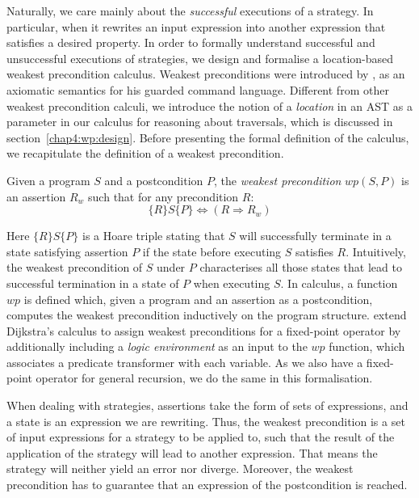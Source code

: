 Naturally, we care mainly about the \emph{successful} executions of a strategy. In particular, when it rewrites an input expression into another expression that satisfies a desired property. In order to formally understand successful and unsuccessful executions of strategies, we design and formalise a location-based weakest precondition calculus. Weakest preconditions were introduced by \citet{DBLP:journals/cacm/Dijkstra75}, as an axiomatic semantics for his guarded command language.
Different from other weakest precondition calculi, we introduce the notion of a \emph{location} in an AST as a parameter in our calculus for reasoning about traversals, which is discussed in section~\ref{chap4:wp:design}.
Before presenting the formal definition of the calculus, we recapitulate the definition of a weakest precondition.
\begin{definition} Given a program $S$ and a postcondition $P$, the \textit{weakest precondition} $\mathit{wp}(S,P)$ is an assertion $R_w$ such that for any precondition $R$:
    \[\{R\} S \{P\} \Leftrightarrow (R \Rightarrow R_w)\]
\end{definition}
\noindent Here $\{R\} S \{P\}$ is a Hoare triple stating that $S$ will successfully terminate in a state satisfying assertion $P$ if the state before executing $S$ satisfies $R$. Intuitively, the weakest precondition of $S$ under $P$ characterises all those states that lead to successful termination in a state of $P$ when executing $S$.
In  calculus, a function $\mathit{wp}$ is defined which, given a program and an assertion as a postcondition, computes the weakest precondition inductively on the program structure. \citet{DBLP:conf/rex/BonsangueK92} extend Dijkstra's calculus to assign weakest preconditions for a fixed-point operator by additionally including a \emph{logic environment} as an input to the $\mathit{wp}$ function, which associates a predicate transformer with each variable. As we also have a fixed-point operator for general recursion, we do the same in this formalisation.

When dealing with strategies, assertions take the form of sets of expressions, and a state is an expression we are rewriting. Thus, the weakest precondition is a set of input expressions for a strategy to be applied to, such that the result of the application of the strategy will lead to another expression. That means the strategy will neither yield an error nor diverge. Moreover, the weakest precondition has to guarantee that an expression of the postcondition is reached.

